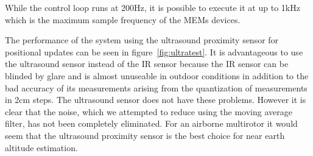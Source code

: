 While the control loop runs at 200Hz, it is possible to execute it at up to 1kHz which is the maximum sample frequency of the 
MEMs devices.

The performance of the system using the ultrasound proximity sensor for positional updates can be seen in figure~\ref{fig:ultratest}.
It is advantageous to use the ultrasound sensor instead of the IR sensor because the IR sensor can be blinded by glare and is almost
unuseable in outdoor conditions in addition to the bad accuracy of its measurements arising from the quantization of measurements in
2cm steps. The ultrasound sensor does not have these problems. However it is clear that the noise, which we attempted to reduce using the
moving average filter, has not been completely eliminated. For an airborne multirotor it would seem that the ultrasound proximity 
sensor is the best choice for near earth altitude estimation.
	
